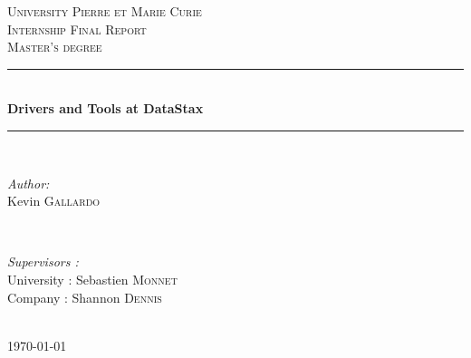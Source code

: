 \documentclass[a4paper]{report}
\begin{document}
\begin{titlepage}

\newcommand{\HRule}{\rule{\linewidth}{0.5mm}} %

\center %
 

\textsc{\LARGE University Pierre et Marie Curie}\\[1.5cm] %
\textsc{\Large Internship Final Report}\\[0.5cm] %
\textsc{\large Master's degree}\\[0.5cm] %


\HRule \\[0.4cm]
{ \huge \bfseries Drivers and Tools at DataStax}\\[0.4cm] %
\HRule \\[1.5cm]
 

\begin{minipage}{0.4\textwidth}
\begin{flushleft} \large
\emph{Author:}\\
Kevin \textsc{Gallardo} %
\end{flushleft}
\end{minipage}
~
\begin{minipage}{0.4\textwidth}
\begin{flushright} \large
\emph{Supervisors :} \\
University : Sebastien \textsc{Monnet} \\
Company : Shannon \textsc{Dennis} %
\end{flushright}
\end{minipage}\\[4cm]


{\large \today}\\[3cm] %


\vfill %

\end{titlepage}
\addtocounter{page}{-1}
\end{document}
